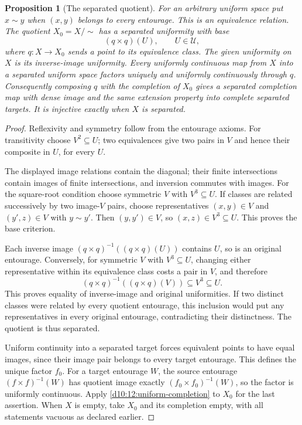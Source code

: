 \documentclass[11pt,oneside,openany]{book}
\newtheorem{proposition}[theorem]{Proposition}
\theoremstyle{definition}
\theoremstyle{remark}
\begin{document}
\begin{proposition}[The separated quotient]\label{d10:12:separated-quotient}
For an arbitrary uniform space put $x\sim y$ when $(x,y)$ belongs to every entourage. This is an equivalence relation. The quotient $X_0=X/{\sim}$ has a separated uniformity with base
\[
 (q\times q)(U),\qquad U\in\mathcal U,
\]
where $q:X\to X_0$ sends a point to its equivalence class. The given uniformity on $X$ is its inverse-image uniformity. Every uniformly continuous map from $X$ into a separated uniform space factors uniquely and uniformly continuously through $q$. Consequently composing $q$ with the completion of $X_0$ gives a separated completion map with dense image and the same extension property into complete separated targets. It is injective exactly when $X$ is separated.
\end{proposition}
\begin{proof}
Reflexivity and symmetry follow from the entourage axioms. For transitivity choose $V^2\subseteq U$; two equivalences give two pairs in $V$ and hence their composite in $U$, for every $U$.

The displayed image relations contain the diagonal; their finite intersections contain images of finite intersections, and inversion commutes with images. For the square-root condition choose symmetric $V$ with $V^3\subseteq U$. If classes are related successively by two image-$V$ pairs, choose representatives $(x,y)\in V$ and $(y',z)\in V$ with $y\sim y'$. Then $(y,y')\in V$, so $(x,z)\in V^3\subseteq U$. This proves the base criterion.

Each inverse image $(q\times q)^{-1}((q\times q)(U))$ contains $U$, so is an original entourage. Conversely, for symmetric $V$ with $V^3\subseteq U$, changing either representative within its equivalence class costs a pair in $V$, and therefore
\[
 (q\times q)^{-1}((q\times q)(V))\subseteq V^3\subseteq U.
\]
This proves equality of inverse-image and original uniformities. If two distinct classes were related by every quotient entourage, this inclusion would put any representatives in every original entourage, contradicting their distinctness. The quotient is thus separated.

Uniform continuity into a separated target forces equivalent points to have equal images, since their image pair belongs to every target entourage. This defines the unique factor $f_0$. For a target entourage $W$, the source entourage $(f\times f)^{-1}(W)$ has quotient image exactly $(f_0\times f_0)^{-1}(W)$, so the factor is uniformly continuous. Apply \cref{d10:12:uniform-completion} to $X_0$ for the last assertion. When $X$ is empty, take $X_0$ and its completion empty, with all statements vacuous as declared earlier.
\end{proof}
\end{document}
